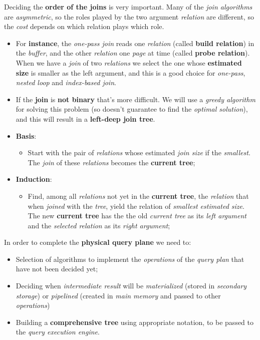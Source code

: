 \documentclass{article}
\begin{document}
Deciding the \textbf{order of the joins} is very important. Many of the \emph{join algorithms} are \emph{asymmetric}, so the roles played by the two argument \emph{relation} are different, so the \emph{cost} depends on which relation plays which role. 
\begin{itemize}
\item For \textbf{instance}, the \emph{one-pass join} reads one \emph{relation} (called \textbf{build relation}) in the \emph{buffer}, and the other \emph{relation} one \emph{page} at time (called \textbf{probe relation}). When we have a \emph{join} of two \emph{relations} we select the one whose \textbf{estimated size} is smaller as the left argument, and this is a good choice for \emph{one-pass}, \emph{nested loop} and \emph{index-based join}.
\item If the \textbf{join} is \textbf{not binary} that's more difficult. We will use a \emph{greedy algorithm} for solving this problem (so doesn't guarantee to find the \emph{optimal solution}), and this will result in a \textbf{left-deep join tree}.
\end{itemize}
\begin{itemize}
\item \textbf{Basis}:
\begin{itemize}
\item Start with the pair of \emph{relations} whose estimated \emph{join size} if the \emph{smallest}. The \emph{join} of these \emph{relations} becomes the \textbf{current tree};
\end{itemize}
\item \textbf{Induction}:
\begin{itemize}
\item Find, among all \emph{relations} not yet in the \textbf{current tree}, the \emph{relation} that when \emph{joined} with the \emph{tree}, yield the relation of \emph{smallest estimated size}. The new \textbf{current tree} has the the old \emph{current tree} as its \emph{left argument} and the \emph{selected relation} as its \emph{right argument};
\end{itemize}
\end{itemize}
In order to complete the \textbf{physical query plane} we need to:
\begin{itemize}
\item Selection of algorithms to implement the \emph{operations} of the \emph{query plan} that have not been decided yet;
\item Deciding when \emph{intermediate result} will be \emph{materialized} (stored in \emph{secondary storage}) or \emph{pipelined} (created in \emph{main memory} and passed to other \emph{operations})
\item Building a \textbf{comprehensive tree} using appropriate notation, to be passed to the \emph{query execution engine}.
\end{itemize}
\end{document}
